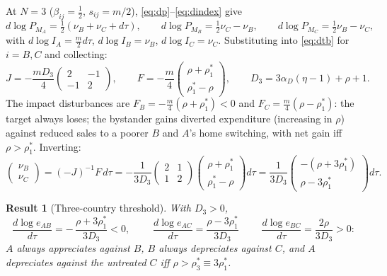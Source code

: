 \documentclass[11pt]{article}
\newtheorem{result}{Result}[section]
\begin{document}
At $N = 3$ ($\beta_{ij} = \tfrac12$, $s_{ij} = m/2$), \eqref{eq:dp}--\eqref{eq:dindex} give
\begin{equation}
d\log P_{M_A} = \tfrac{1}{2}(\nu_B + \nu_C + d\tau), \qquad
d\log P_{M_B} = \tfrac{1}{2}\nu_C - \nu_B, \qquad
d\log P_{M_C} = \tfrac{1}{2}\nu_B - \nu_C ,
\label{eq:3c-indices}
\end{equation}
with $d\log I_A = \tfrac{m}{2} d\tau$, $d\log I_B = \nu_B$, $d\log I_C = \nu_C$. Substituting into \eqref{eq:dtb} for $i = B, C$ and collecting:
\begin{equation}
J = -\frac{mD_3}{4}\begin{pmatrix} 2 & -1 \\ -1 & 2 \end{pmatrix},
\qquad
F = -\frac{m}{4}\begin{pmatrix} \rho + \rho_1^* \\ \rho_1^* - \rho \end{pmatrix},
\qquad
D_3 = 3\alpha_D(\eta-1) + \rho + 1 .
\label{eq:3c-JF}
\end{equation}
The impact disturbances are $F_B = -\tfrac{m}{4}(\rho + \rho_1^*) < 0$ and $F_C = \tfrac{m}{4}(\rho - \rho_1^*)$: the target always loses; the bystander gains diverted expenditure (increasing in $\rho$) against reduced sales to a poorer $B$ and $A$'s home switching, with net gain iff $\rho > \rho_1^*$. Inverting:
\begin{equation}
\begin{pmatrix} \nu_B \\ \nu_C \end{pmatrix}
= (-J)^{-1} F\, d\tau
= -\frac{1}{3D_3}
\begin{pmatrix} 2 & 1 \\ 1 & 2 \end{pmatrix}
\begin{pmatrix} \rho + \rho_1^* \\ \rho_1^* - \rho \end{pmatrix} d\tau
= \frac{1}{3D_3}
\begin{pmatrix} -(\rho + 3\rho_1^*) \\ \rho - 3\rho_1^* \end{pmatrix} d\tau .
\label{eq:3c-solution}
\end{equation}

\begin{result}[Three-country threshold]
With $D_3 > 0$,
\begin{equation}
\frac{d\log e_{AB}}{d\tau} = -\,\frac{\rho + 3\rho_1^*}{3D_3} < 0,
\qquad
\boxed{\;\frac{d\log e_{AC}}{d\tau} = \frac{\rho - 3\rho_1^*}{3D_3}\;}
\qquad
\frac{d\log e_{BC}}{d\tau} = \frac{2\rho}{3D_3} > 0 :
\label{eq:3c-slopes}
\end{equation}
$A$ always appreciates against $B$, $B$ always depreciates against $C$, and $A$ depreciates against the untreated $C$ iff $\rho > \rho_3^* \equiv 3\rho_1^*$.
\label{res:3c}
\end{result}
\end{document}

